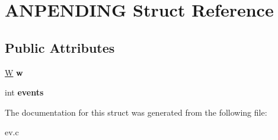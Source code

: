 \hypertarget{struct_a_n_p_e_n_d_i_n_g}{}\section{A\+N\+P\+E\+N\+D\+I\+NG Struct Reference}
\label{struct_a_n_p_e_n_d_i_n_g}
\subsection*{Public Attributes}
\begin{DoxyCompactItemize}
\item 
\hypertarget{struct_a_n_p_e_n_d_i_n_g_a5333be08545d7d50128b62c825cc5923}{}\label{struct_a_n_p_e_n_d_i_n_g_a5333be08545d7d50128b62c825cc5923} 
\hyperlink{structev__watcher}{W} {\bfseries w}
\item 
\hypertarget{struct_a_n_p_e_n_d_i_n_g_ad93f4db748d9b13ac5c8bbb114950761}{}\label{struct_a_n_p_e_n_d_i_n_g_ad93f4db748d9b13ac5c8bbb114950761} 
int {\bfseries events}
\end{DoxyCompactItemize}


The documentation for this struct was generated from the following file\+:\begin{DoxyCompactItemize}
\item 
ev.\+c\end{DoxyCompactItemize}

